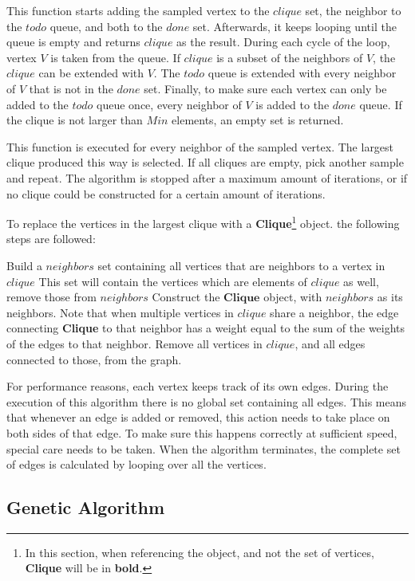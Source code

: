This function starts adding the sampled vertex to the $clique$ set, the neighbor to the $todo$ queue, and both to the $done$ set. Afterwards, it keeps looping until the queue is empty and returns $clique$ as the result. During each cycle of the loop, vertex $V$ is taken from the queue. If $clique$ is a subset of the neighbors of $V$, the $clique$ can be extended with $V$. The $todo$ queue is extended with every neighbor of $V$ that is not in the $done$ set. Finally, to make sure each vertex can only be added to the $todo$ queue once, every neighbor of $V$ is added to the $done$ queue. If the clique is not larger than $Min$ elements, an empty set is returned.
\par
This function is executed for every neighbor of the sampled vertex. The largest clique produced this way is selected. If all cliques are empty, pick another sample and repeat. The algorithm is stopped after a maximum amount of iterations, or if no clique could be constructed for a certain amount of iterations.
\par
 To replace the vertices in the largest clique with a \textbf{Clique}\footnote{In this section, when referencing the object, and not the set of vertices, \textbf{Clique} will be in \textbf{bold}.} object. the following steps are followed:
\begin{algorithmic}[1]
\STATE Build a $neighbors$ set containing all vertices that are neighbors to a vertex in $clique$
\STATE This set will contain the vertices which are elements of $clique$ as well, remove those from $neighbors$
\STATE Construct the $\textbf{Clique}$ object, with $neighbors$ as its neighbors. Note that when multiple vertices in $clique$ share a neighbor, the edge connecting \textbf{Clique} to that neighbor has a weight equal to the sum of the weights of the edges to that neighbor.
\STATE Remove all vertices in $clique$, and all edges connected to those, from the graph.
\end{algorithmic}
\par
For performance reasons, each vertex keeps track of its own edges. During the execution of this algorithm there is no global set containing all edges. This means that whenever an edge is added or removed, this action needs to take place on both sides of that edge. To make sure this happens correctly at sufficient speed, special care needs to be taken. When the algorithm terminates, the complete set of edges is calculated by looping over all the vertices.
\subsection{Genetic Algorithm}
